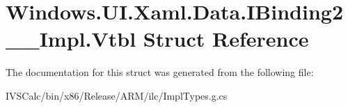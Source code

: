 \hypertarget{struct_windows_1_1_u_i_1_1_xaml_1_1_data_1_1_i_binding2_____impl_1_1_vtbl}{}\section{Windows.\+U\+I.\+Xaml.\+Data.\+I\+Binding2\+\_\+\+\_\+\+Impl.\+Vtbl Struct Reference}
\label{struct_windows_1_1_u_i_1_1_xaml_1_1_data_1_1_i_binding2_____impl_1_1_vtbl}


The documentation for this struct was generated from the following file\+:\begin{DoxyCompactItemize}
\item 
I\+V\+S\+Calc/bin/x86/\+Release/\+A\+R\+M/ilc/Impl\+Types.\+g.\+cs\end{DoxyCompactItemize}
